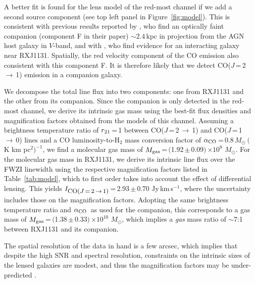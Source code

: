 \documentclass[]{emulateapj}
\newcommand{\Msun}{\mbox{$M_{\odot}$}\xspace}
\newcommand{\rarr}{$\rightarrow$}
\newcommand{\aco}{\mbox{CO($J$\,=\,1\,\rarr\,0)}\xspace}
\newcommand{\bco}{\mbox{CO($J$\,=\,2\,\rarr\,1)}\xspace}
\newcommand{\kms}{\mbox{km\,s$^{-1}$}\xspace}
\newcommand{\alphaco}{\mbox{$\alpha_{\rm CO}$}\xspace}
\newcommand{\alphaU}{\mbox{$M_{\odot}~($K\,\,km\,\,pc$^2)^{-1}$}\xspace}
\newcommand{\E}[1]{\mbox{$\times10^{#1}$}}
\newcommand{\pmm}{\,$\pm$\,}
\newcommand{\Fig}[1]{Figure~\ref{fig:#1}}
\newcommand{\Tab}[1]{Table~\ref{tab:#1}}
\begin{document}
A better fit is found for the lens model of
the red-most channel if we add a second source component (see
top left panel in \Fig{model}). This is consistent with previous results
reported by \citet[hereafter B08]{Brewer08a}, who find an optically faint companion
(component F in their paper) $\sim$2.4\,kpc in projection from the AGN host galaxy in $V$-band,
and with , who find evidence for an interacting galaxy near RXJ1131.
Spatially, the red velocity component of the CO emission
also consistent with this component F. It is therefore likely that we
detect \bco emission in a companion galaxy.

We decompose the total line flux into two components:
one from RXJ1131 and the other from its companion.
Since the companion is only detected in the red-most channel, we
derive its intrinsic gas mass using the best-fit flux
densities and magnification factors obtained from the models of this channel.
Assuming a brightness temperature ratio
of $r_{\rm 21}$\,=\,1 between \bco and \aco lines and
a CO luminosity-to-H$_2$ mass conversion factor of
\alphaco\,=\,0.8\,\alphaU, we find
a molecular gas mass of $M_{\rm gas}$\,=\,$($1.92\pmm0.09$)$\,\E{9} \Msun.
For the molecular gas mass in RXJ1131, we derive
its intrinsic line flux over the FWZI linewidth
using the respective magnification
factors listed in \Tab{model}, which to
first order takes into account the effect of differential lensing.
This yields $I_{\small \bco}$\,=\,2.93\pmm0.70 Jy\,\kms,
where the uncertainty includes those on
the magnification factors.
Adopting the same brightness temperature ratio and \alphaco\ as
used for the companion, this corresponds to a gas mass of
$M_{\rm gas}$\,=\,$($1.38\pmm0.33$)$\,\E{10} \Msun, which
implies a {\em gas} mass ratio of $\sim$7:1 between RXJ1131 and its companion.

The spatial resolution of the data in hand
is a few arcsec, which implies that despite the high SNR and spectral
resolution, constraints on the intrinsic sizes of the lensed galaxies are modest, and thus the magnification
factors may be under-predicted \citep[see e.g.,][]{Bussmann15a,Dye15a,Rybak15a}.
\end{document}
